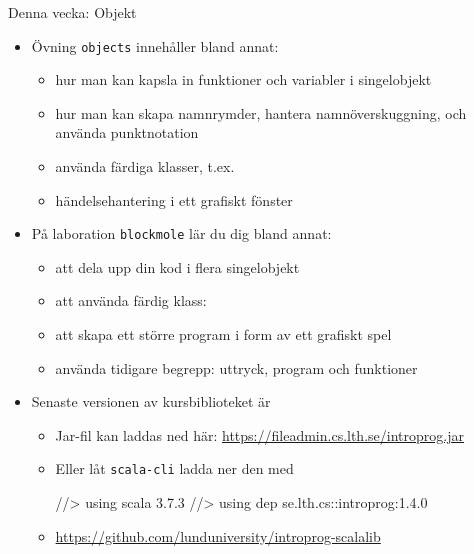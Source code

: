 \begin{SlideExtra}{Denna vecka: Objekt}
\begin{itemize}\SlideFontSmall
\item Övning \texttt{objects} innehåller bland annat:
\begin{itemize}\SlideFontTiny
\item hur man kan kapsla in funktioner och variabler i singelobjekt
\item hur man kan skapa namnrymder, hantera namnöverskuggning, och använda punktnotation
\item använda färdiga klasser, t.ex. 
\item händelsehantering i ett grafiskt fönster
\end{itemize}

\item På laboration \texttt{blockmole} lär du dig bland annat:
\begin{itemize}\SlideFontTiny
  \item att dela upp din kod i flera singelobjekt
  \item att använda färdig klass: 
  \item att skapa ett större program i form av ett grafiskt spel
  \item använda tidigare begrepp: uttryck, program och funktioner
\end{itemize}

\item Senaste versionen av kursbiblioteket  är \Emph{\LibVersion} 
\begin{itemize}\SlideFontTiny
\item Jar-fil kan laddas ned här: \url{https://fileadmin.cs.lth.se/introprog.jar}
\item Eller låt \texttt{scala-cli} ladda ner den med
\begin{Code}
//> using scala 3.7.3
//> using dep se.lth.cs::introprog:1.4.0  
\end{Code} 
\item \url{https://github.com/lunduniversity/introprog-scalalib}
\end{itemize}
\end{itemize}
\end{SlideExtra}


